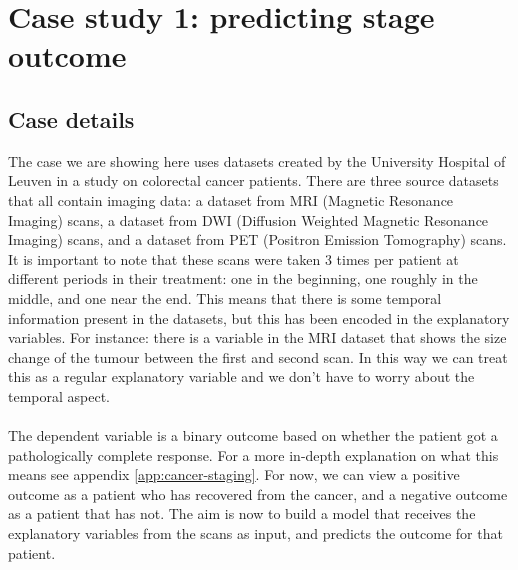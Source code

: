 \section{Case study 1: predicting stage outcome}
\label{sec:evaluation-predictingstage}
\subsection{Case details}
\label{sec:evaluation-casedetails}
The case we are showing here uses datasets created by the University Hospital of Leuven in a study on colorectal cancer patients. There are three source datasets that all contain imaging data: a dataset from MRI (Magnetic Resonance Imaging) scans, a dataset from DWI (Diffusion Weighted Magnetic Resonance Imaging) scans, and a dataset from PET (Positron Emission Tomography) scans. It is important to note that these scans were taken 3 times per patient at different periods in their treatment: one in the beginning, one roughly in the middle, and one near the end. This means that there is some temporal information present in the datasets, but this has been encoded in the explanatory variables. For instance: there is a variable in the MRI dataset that shows the size change of the tumour between the first and second scan. In this way we can treat this as a regular explanatory variable and we don't have to worry about the temporal aspect. \\ \\
The dependent variable is a binary outcome based on whether the patient got a pathologically complete response. For a more in-depth explanation on what this means see appendix \ref{app:cancer-staging}. For now, we can view a positive outcome as a patient who has recovered from the cancer, and a negative outcome as a patient that has not. The aim is now to build a model that receives the explanatory variables from the scans as input, and predicts the outcome for that patient.
